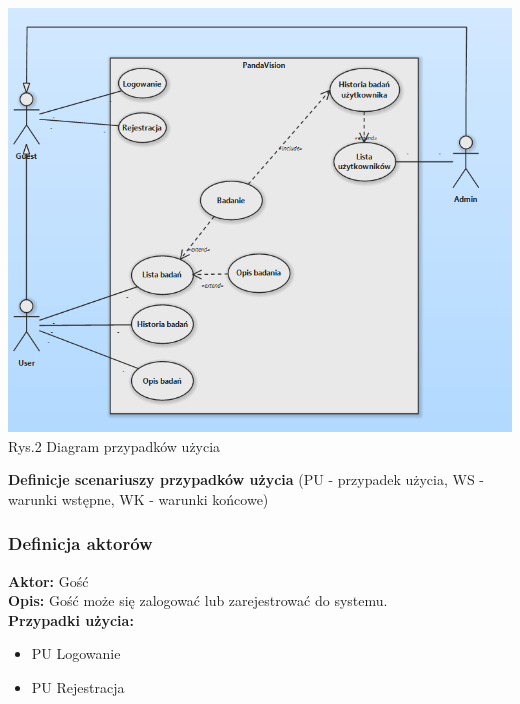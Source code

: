 \documentclass[12pt, letterpaper]{article}
\begin{document}
		\begin{center}
			\includegraphics[scale=0.5]{usecase_diagram}\\
			\caption{Rys.2 Diagram przypadków użycia}
		\end{center}		
		
		\textbf{Definicje scenariuszy przypadków użycia} (PU - przypadek użycia, WS - warunki wstępne, WK - warunki końcowe)\\
		
		\newpage
		
		
		\subsubsection{Definicja aktorów}
		
		\quad		
		
		\textbf{Aktor:} Gość\\
		
		\textbf{Opis:} Gość może się zalogować lub zarejestrować do systemu.\\
		
		\textbf{Przypadki użycia:}
		
		\begin{itemize}
			\item PU Logowanie
			\item PU Rejestracja
		\end{itemize}
		
\end{document}
